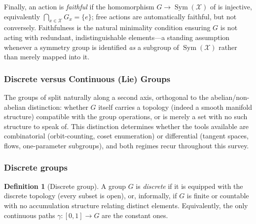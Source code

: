 \documentclass[11pt]{article}
\theoremstyle{plain}
\theoremstyle{definition}
\newtheorem{Definition}{Definition}[section]
\begin{document}
Finally, an action is \emph{faithful} if the homomorphism
$G \to \operatorname{Sym}(\mathcal{X})$ of  is injective,
equivalently $\bigcap_{x \in \mathcal{X}} G_x = \{e\}$; free actions are automatically
faithful, but not conversely. Faithfulness is the natural minimality
condition ensuring $G$ is not acting with redundant, indistinguishable
elements---a standing assumption whenever a symmetry group is identified
\emph{as} a subgroup of $\operatorname{Sym}(\mathcal{X})$ rather than merely mapped into it.





\subsubsection{Discrete versus Continuous (Lie) Groups}
\label{subsec:discrete-vs-lie}

The groups of  split naturally along a second axis,
orthogonal to the abelian/non-abelian distinction: whether $G$ itself carries
a topology (indeed a smooth manifold structure) compatible with the group
operations, or is merely a set with no such structure to speak of. This
distinction determines whether the tools available are combinatorial
(orbit-counting, coset enumeration) or differential (tangent spaces, flows,
one-parameter subgroups), and both regimes recur throughout this survey.

\subsubsection{Discrete groups}
\label{subsubsec:discrete-groups}

\begin{Definition}[Discrete group]
\label{def:discrete-group}
A group $G$ is \emph{discrete} if it is equipped with the discrete topology
(every subset is open), or, informally, if $G$ is finite or countable with
no accumulation structure relating distinct elements. Equivalently, the only
continuous paths $\gamma : [0,1] \to G$ are the constant ones.
\end{Definition}
\end{document}
